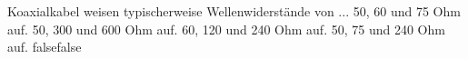     {Koaxialkabel weisen typischerweise Wellenwiderstände von ...}
    {50, 60 und 75 Ohm auf.}
    {50, 300 und 600 Ohm auf.}
    {60, 120 und 240 Ohm auf.}
    {50, 75 und 240 Ohm auf.}
    {false}{false}